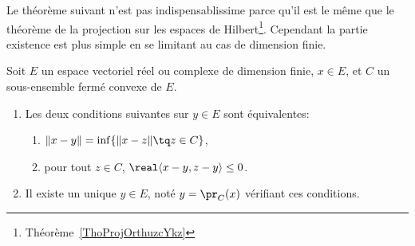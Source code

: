 Le théorème suivant n'est pas indispensablissime parce qu'il est le même que le théorème de la projection sur les espaces de Hilbert\footnote{Théorème~\ref{ThoProjOrthuzcYkz}}. Cependant la partie existence est plus simple en se limitant au cas de dimension finie.
\begin{theoremDef}  \label{ThoWKwosrH}
	Soit \( E\) un espace vectoriel réel ou complexe de dimension finie, \( x\in E\), et \( C\) un sous-ensemble fermé convexe de \(E\).
	\begin{enumerate}
		\item
		      Les deux conditions suivantes sur \( y\in E\) sont équivalentes:
		      \begin{enumerate}
			      \item   \label{zzETsfYCSItemi}
			            \( \| x-y \|=\inf\{ \| x-z \|\tq z\in C \}\),
			            \item\label{zzETsfYCSItemii}
			            pour tout \( z\in C\), \( \real\langle x-y, z-y\rangle \leq 0\).
		      \end{enumerate}
		\item
		      Il existe un unique \( y\in E\), noté \( y=\pr_C(x)\) vérifiant ces conditions.
	\end{enumerate}
\end{theoremDef}

